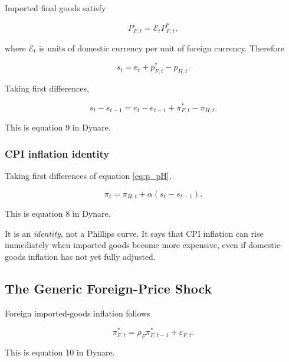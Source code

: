 Imported final goods satisfy

\begin{equation}
P_{F,t}
=
\mathcal E_tP_{F,t}^{*},
\label{eq:lop}
\end{equation}

where \(\mathcal E_t\) is units of domestic currency per unit of foreign
currency. Therefore

\begin{equation}
s_t
=
e_t+p_{F,t}^{*}-p_{H,t}.
\end{equation}

Taking first differences,

\begin{equation}
\boxed{
s_t-s_{t-1}
=
e_t-e_{t-1}
+
\pi_{F,t}^{*}
-
\pi_{H,t}.
}
\label{eq:tot_final}
\end{equation}

This is equation 9 in Dynare.

\subsubsection{CPI inflation identity}

Taking first differences of equation \eqref{eq:p_pH},

\begin{equation}
\boxed{
\pi_t
=
\pi_{H,t}
+
\alpha(s_t-s_{t-1}).
}
\label{eq:cpi_final}
\end{equation}

This is equation 8 in Dynare.

It is an \emph{identity}, not a Phillips curve. It says that CPI inflation can
rise immediately when imported goods become more expensive, even if
domestic-goods inflation has not yet fully adjusted.

\subsection{The Generic Foreign-Price Shock}
\label{app:foreign_price}

Foreign imported-goods inflation follows

\begin{equation}
\boxed{
\pi_{F,t}^{*}
=
\rho_F\pi_{F,t-1}^{*}
+
\varepsilon_{F,t}.
}
\label{eq:pif_final}
\end{equation}

This is equation 10 in Dynare.

